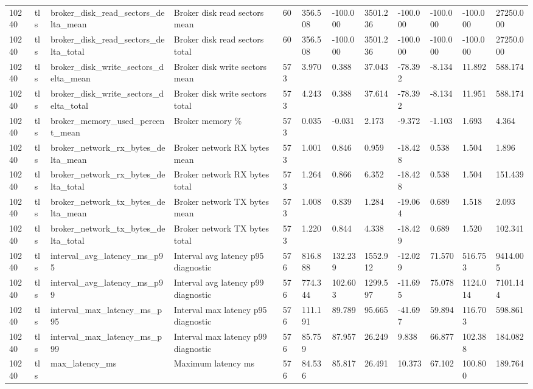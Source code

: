 \begin{longtable}{llllllllllll}
10240 & tls & broker\_disk\_read\_sectors\_delta\_mean & Broker disk read sectors mean & 60 & 356.508 & -100.000 & 3501.236 & -100.000 & -100.000 & -100.000 & 27250.000 \\
10240 & tls & broker\_disk\_read\_sectors\_delta\_total & Broker disk read sectors total & 60 & 356.508 & -100.000 & 3501.236 & -100.000 & -100.000 & -100.000 & 27250.000 \\
10240 & tls & broker\_disk\_write\_sectors\_delta\_mean & Broker disk write sectors mean & 573 & 3.970 & 0.388 & 37.043 & -78.392 & -8.134 & 11.892 & 588.174 \\
10240 & tls & broker\_disk\_write\_sectors\_delta\_total & Broker disk write sectors total & 573 & 4.243 & 0.388 & 37.614 & -78.392 & -8.134 & 11.951 & 588.174 \\
10240 & tls & broker\_memory\_used\_percent\_mean & Broker memory \% & 573 & 0.035 & -0.031 & 2.173 & -9.372 & -1.103 & 1.693 & 4.364 \\
10240 & tls & broker\_network\_rx\_bytes\_delta\_mean & Broker network RX bytes mean & 573 & 1.001 & 0.846 & 0.959 & -18.428 & 0.538 & 1.504 & 1.896 \\
10240 & tls & broker\_network\_rx\_bytes\_delta\_total & Broker network RX bytes total & 573 & 1.264 & 0.866 & 6.352 & -18.428 & 0.538 & 1.504 & 151.439 \\
10240 & tls & broker\_network\_tx\_bytes\_delta\_mean & Broker network TX bytes mean & 573 & 1.008 & 0.839 & 1.284 & -19.064 & 0.689 & 1.518 & 2.093 \\
10240 & tls & broker\_network\_tx\_bytes\_delta\_total & Broker network TX bytes total & 573 & 1.220 & 0.844 & 4.338 & -18.429 & 0.689 & 1.520 & 102.341 \\
10240 & tls & interval\_avg\_latency\_ms\_p95 & Interval avg latency p95 diagnostic & 576 & 816.888 & 132.239 & 1552.912 & -12.029 & 71.570 & 516.753 & 9414.005 \\
10240 & tls & interval\_avg\_latency\_ms\_p99 & Interval avg latency p99 diagnostic & 576 & 774.344 & 102.603 & 1299.597 & -11.695 & 75.078 & 1124.014 & 7101.144 \\
10240 & tls & interval\_max\_latency\_ms\_p95 & Interval max latency p95 diagnostic & 576 & 111.191 & 89.789 & 95.665 & -41.697 & 59.894 & 116.703 & 598.861 \\
10240 & tls & interval\_max\_latency\_ms\_p99 & Interval max latency p99 diagnostic & 576 & 85.759 & 87.957 & 26.249 & 9.838 & 66.877 & 102.388 & 184.082 \\
10240 & tls & max\_latency\_ms & Maximum latency ms & 576 & 84.536 & 85.817 & 26.491 & 10.373 & 67.102 & 100.800 & 189.764 \\

\end{longtable}
